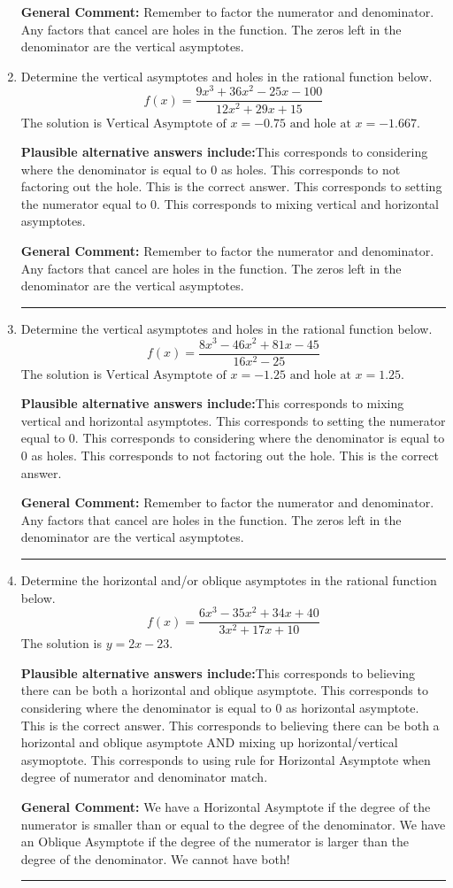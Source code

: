\documentclass{extbook}[14pt]
\newcommand{\litem}[1]{\item #1

\rule{\textwidth}{0.4pt}}
\begin{document}
\begin{enumerate}
{\textbf{General Comment:} Remember to factor the numerator and denominator. Any factors that cancel are holes in the function. The zeros left in the denominator are the vertical asymptotes.
}
\litem{
Determine the vertical asymptotes and holes in the rational function below.
\[ f(x) = \frac{9x^{3} +36 x^{2} -25 x -100}{12x^{2} +29 x + 15} \]The solution is \( \text{Vertical Asymptote of } x = -0.75 \text{ and hole at } x = -1.667 \).\begin{enumerate}[label=\Alph*.]
\textbf{Plausible alternative answers include:}This corresponds to considering where the denominator is equal to 0 as holes.
This corresponds to not factoring out the hole.
This is the correct answer.
This corresponds to setting the numerator equal to 0.
This corresponds to mixing vertical and horizontal asymptotes.
\end{enumerate}

\textbf{General Comment:} Remember to factor the numerator and denominator. Any factors that cancel are holes in the function. The zeros left in the denominator are the vertical asymptotes.
}
\litem{
Determine the vertical asymptotes and holes in the rational function below.
\[ f(x) = \frac{8x^{3} -46 x^{2} +81 x -45}{16x^{2} -25} \]The solution is \( \text{Vertical Asymptote of } x = -1.25 \text{ and hole at } x = 1.25 \).\begin{enumerate}[label=\Alph*.]
\textbf{Plausible alternative answers include:}This corresponds to mixing vertical and horizontal asymptotes.
This corresponds to setting the numerator equal to 0.
This corresponds to considering where the denominator is equal to 0 as holes.
This corresponds to not factoring out the hole.
This is the correct answer.
\end{enumerate}

\textbf{General Comment:} Remember to factor the numerator and denominator. Any factors that cancel are holes in the function. The zeros left in the denominator are the vertical asymptotes.
}
\litem{
Determine the horizontal and/or oblique asymptotes in the rational function below.
\[ f(x) = \frac{6x^{3} -35 x^{2} +34 x + 40}{3x^{2} +17 x + 10} \]The solution is \( y = 2x -23 \).\begin{enumerate}[label=\Alph*.]
\textbf{Plausible alternative answers include:}This corresponds to believing there can be both a horizontal and oblique asymptote.
This corresponds to considering where the denominator is equal to 0 as horizontal asymptote.
This is the correct answer.
This corresponds to believing there can be both a horizontal and oblique asymptote AND mixing up horizontal/vertical asymoptote.
This corresponds to using rule for Horizontal Asymptote when degree of numerator and denominator match.
\end{enumerate}

\textbf{General Comment:} We have a Horizontal Asymptote if the degree of the numerator is smaller than or equal to the degree of the denominator. We have an Oblique Asymptote if the degree of the numerator is larger than the degree of the denominator. We cannot have both!
}
\end{enumerate}
\end{document}
